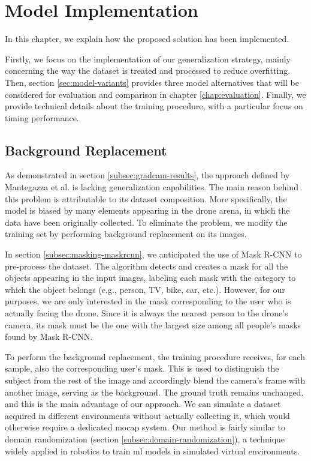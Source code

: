 \chapter{Model Implementation}
\label{chap:implementation}

In this chapter, we explain how the proposed solution has been implemented.

Firstly, we focus on the implementation of our generalization strategy, mainly concerning the way the dataset is treated and processed to reduce overfitting. Then, section \ref{sec:model-variants} provides three model alternatives that will be considered for evaluation and comparison in chapter \ref{chap:evaluation}. Finally, we provide technical details about the training procedure, with a particular focus on timing performance. 




\section{Background Replacement}
\label{sec:implementation-bgreplace}

As demonstrated in section \ref{subsec:gradcam-results}, the approach defined by Mantegazza et al. \cite{mantegazza2019visionbased} is lacking generalization capabilities. The main reason behind this problem is attributable to its dataset composition. More specifically, the model is biased by many elements appearing in the drone arena, in which the data have been originally collected. To eliminate the problem, we modify the training set by performing background replacement on its images.

In section \ref{subsec:masking-maskrcnn}, we anticipated the use of Mask R-CNN to pre-process the dataset. The algorithm detects and creates a mask for all the objects appearing in the input images, labeling each mask with the category to which the object belongs (e.g., person, TV, bike, car, etc.). However, for our purposes, we are only interested in the mask corresponding to the user who is actually facing the drone. Since it is always the nearest person to the drone's camera, its mask must be the one with the largest size among all people's masks found by Mask R-CNN.

\medskip

To perform the background replacement, the training procedure receives, for each sample, also the corresponding user's mask. This is used to distinguish the subject from the rest of the image and accordingly blend the camera's frame with another image, serving as the background. The ground truth remains unchanged, and this is the main advantage of our approach. We can simulate a dataset acquired in different environments without actually collecting it, which would otherwise require a dedicated \gls{mocap} system. Our method is fairly similar to domain randomization (section \ref{subsec:domain-randomization}), a technique widely applied in robotics to train \gls{ml} models in simulated virtual environments.


